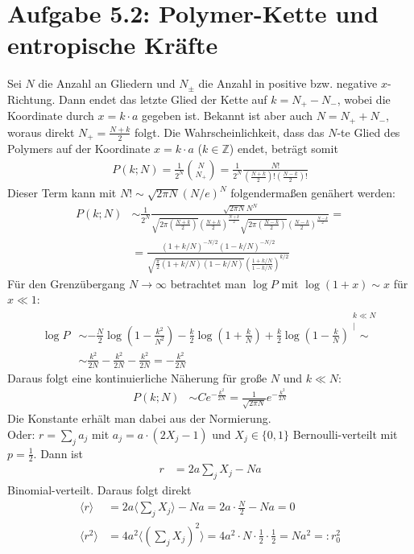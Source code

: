 \documentclass[a4paper,12pt]{article}
\newcommand{\bra}{}
\newcommand{\kom}{}
\newcommand{\kla}{}
\begin{document}
\section*{Aufgabe 5.2: Polymer-Kette und entropische Kräfte}
Sei $N$ die Anzahl an Gliedern und $N_\pm$ die Anzahl in positive bzw. negative $x$-Richtung. Dann endet das letzte Glied der Kette auf $k=N_+-N_-$, wobei die Koordinate durch $x=k\cdot a$ gegeben ist. Bekannt ist aber auch $N=N_++N_-$, woraus direkt $N_+=\frac{N+k}{2}$ folgt. Die Wahrscheinlichkeit, dass das $N$-te Glied des Polymers auf der Koordinate $x=k\cdot a$ ($k\in\mathbb{Z}$) endet, beträgt somit
\begin{align*}
P(k;N)=\frac{1}{2^N}\binom{N}{N_+}=\frac{1}{2^N}\frac{N!}{(\frac{N+k}{2})!(\frac{N-k}{2})!}
\end{align*}
Dieser Term kann mit $N!\sim\sqrt{2\pi N}(N/e)^N$ folgendermaßen genähert werden:
\begin{align*}
P(k;N)&\sim\frac{1}{2^N}\frac{\sqrt{2\pi N}N^N}{\sqrt{2\pi(\frac{N+k}{2})}(\frac{N+k}{2})^{\frac{N+k}{2}}\sqrt{2\pi (\frac{N-k}{2})}(\frac{N-k}{2})^{\frac{N-k}{2}}}=\\
&=\frac{(1+k/N)^{-N/2}(1-k/N)^{-N/2}}{\sqrt{\frac{\pi}{2}(1+k/N)(1-k/N)}(\frac{1+k/N}{1-k/N})^{k/2}}
\end{align*}
Für den Grenzübergang $N\rightarrow\infty$ betrachtet man $\log P$ mit $\log(1+x)\sim x$ für $x\ll 1$:
\begin{align*}
\log P&\sim -\frac{N}{2}\log\kla\left( {1-\frac{k^2}{N^2}} \right)-\frac{k}{2}\log \kla\left( {1+\frac{k}{N}} \right)+\frac{k}{2}\log \kla\left( {1-\frac{k}{N}} \right)\kom\overset{\substack{{k\ll N} \\ |}}{\sim}\\
&\sim\frac{k^2}{2N}-\frac{k^2}{2N}-\frac{k^2}{2N}=-\frac{k^2}{2N}
\end{align*}
Daraus folgt eine kontinuierliche Näherung für große $N$ und $k\ll N$:
\begin{align*}
P(k;N)&\sim Ce^{-\frac{k^2}{2N}}=\frac{1}{\sqrt{2\pi N}}e^{-\frac{k^2}{2N}}
\end{align*}
Die Konstante erhält man dabei aus der Normierung.\\
Oder: $r=\sum_ja_j$ mit $a_j=a\cdot(2X_j-1)$ und $X_j\in\{0,1\}$ Bernoulli-verteilt mit $p=\frac{1}{2}$. Dann ist
\begin{align*}
r&=2a\sum_jX_j-Na
\end{align*}
Binomial-verteilt. Daraus folgt direkt
\begin{align*}
\bra\langle {r}\rangle&=2a\bra\langle {\sum_jX_j}\rangle-Na=2a\cdot\frac{N}{2}-Na=0\\
\bra\langle {r^2}\rangle&=4a^2\bra\langle {\kla\left( {\sum_jX_j} \right)^2}\rangle=4a^2\cdot N\cdot\frac{1}{2}\cdot\frac{1}{2}=Na^2=:r_0^2
\end{align*}
\end{document}
